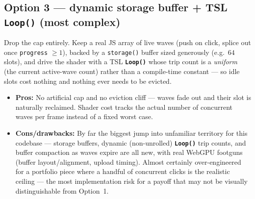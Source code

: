 \documentclass[11pt]{article}
\newcommand{\code}[1]{\texttt{#1}}
\newcommand{\func}[1]{\texttt{\textbf{#1}}}
\begin{document}
\subsection*{Option 3 --- dynamic storage buffer + TSL \func{Loop()} (most complex)}
Drop the cap entirely. Keep a real JS array of live waves (push on click, splice out once
\code{progress} $\ge 1$), backed by a \code{storage()} buffer sized generously (e.g.\ $64$
slots), and drive the shader with a TSL \func{Loop()} whose trip count is a \emph{uniform}
(the current active-wave count) rather than a compile-time constant --- so idle slots cost
nothing and nothing ever needs to be evicted.
\begin{itemize}[leftmargin=1.4em]
  \item \textbf{Pros:} No artificial cap and no eviction cliff --- waves fade out and their
    slot is naturally reclaimed. Shader cost tracks the actual number of concurrent waves
    per frame instead of a fixed worst case.
  \item \textbf{Cons/drawbacks:} By far the biggest jump into unfamiliar territory for this
    codebase --- storage buffers, dynamic (non-unrolled) \func{Loop()} trip counts, and
    buffer compaction as waves expire are all new, with real WebGPU footguns (buffer
    layout/alignment, upload timing). Almost certainly over-engineered for a portfolio
    piece where a handful of concurrent clicks is the realistic ceiling --- the most
    implementation risk for a payoff that may not be visually distinguishable from
    Option~1.
\end{itemize}
\end{document}
